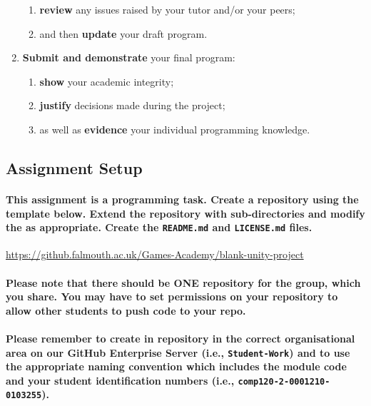 \documentclass{../../fal_assignment}
\begin{document}
\begin{enumerate}
\begin{enumerate}
    		\item \textbf{review} any issues raised by your tutor and/or your peers;
     		\item and then \textbf{update} your draft program.		
	\end{enumerate}
    \item \textbf{Submit and demonstrate} your final program:
    	\begin{enumerate}
    		\item \textbf{show} your academic integrity;
    		\item \textbf{justify} decisions made during the project;
    		\item as well as \textbf{evidence} your individual programming knowledge.
	\end{enumerate}
\end{enumerate}

\vspace{1em}


\subsection*{Assignment Setup}

\paragraph{This assignment is a \textbf{programming task}. Create a repository using the template below. Extend the repository with sub-directories and modify the  as appropriate. Create the \texttt{README.md} and \texttt{LICENSE.md} files.} 

\url{https://github.falmouth.ac.uk/Games-Academy/blank-unity-project}

\paragraph{Please note that there should be \textbf{ONE} repository for the group, which you share. You may have to set permissions on your repository to allow other students to push code to your repo.}

\paragraph{Please remember to create in repository in the correct organisational area on our GitHub Enterprise Server (i.e., \texttt{Student-Work}) and to use the appropriate naming convention which includes the module code and your student identification numbers (i.e., \texttt{comp120-2-0001210-0103255}).}
\end{document}
